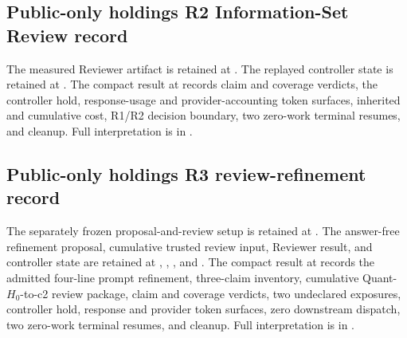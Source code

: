 \subsection{Public-only holdings R2 Information-Set Review record}

The measured Reviewer artifact is retained at
.
The replayed controller state is retained at
.
The compact result at
records claim and coverage verdicts, the controller hold, response-usage and
provider-accounting token surfaces, inherited and cumulative cost, R1/R2
decision boundary, two zero-work terminal resumes, and cleanup. Full
interpretation is in
.

\subsection{Public-only holdings R3 review-refinement record}

The separately frozen proposal-and-review setup is retained at
.
The answer-free refinement proposal, cumulative trusted review input, Reviewer
result, and controller state are retained at
,
,
,
and
.
The compact result at
records the admitted four-line prompt refinement, three-claim inventory,
cumulative Quant-$H_0$-to-c2 review package, claim and coverage verdicts, two
undeclared exposures, controller hold, response and provider token surfaces,
zero downstream dispatch, two zero-work terminal resumes, and cleanup. Full
interpretation is in
.

